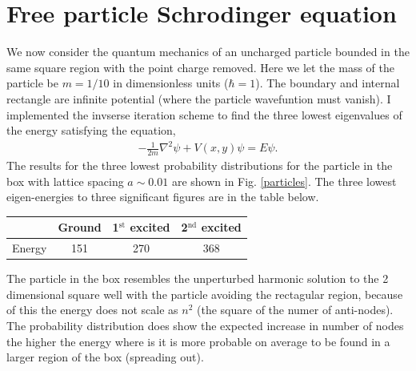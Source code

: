 \documentclass[singlepage,notitlepage,nofootinbib,11pt]{revtex4-1}
\begin{document}
\section{Free particle Schrodinger equation}
We now consider the quantum mechanics of an uncharged particle bounded in the same square region with the point charge removed. Here we let the mass of the particle be $m=1/10$ in dimensionless units ($\hbar = 1$). The boundary and internal rectangle are infinite potential (where the particle wavefuntion must vanish). I implemented the invserse iteration scheme to find the three lowest eigenvalues of the energy satisfying the equation,
\begin{align*}
  -\frac{1}{2m} \nabla^2\psi + V(x,y)\psi = E\psi.
\end{align*}
The results for the three lowest probability distributions for the particle in the box with lattice spacing $a\sim0.01$ are shown in Fig. \ref{particles}. The three lowest eigen-energies to three significant figures are in the table below.
\begin{center}
  \begin{tabular}{ c | c | c | c }
    \hspace{1pt} & Ground & 1$^{\text{st}}$ excited & 2$^{\text{nd}}$ excited \\ \hline
    Energy & 151 & 270 & 368
    \end{tabular}
\end{center}
The particle in the box resembles the unperturbed harmonic solution to the 2 dimensional square well with the particle avoiding the rectagular region, because of this the energy does not scale as $n^2$ (the square of the numer of anti-nodes). The probability distribution does show the expected increase in number of nodes the higher the energy where is it is more probable on average to be found in a larger region of the box (spreading out).
\end{document}
